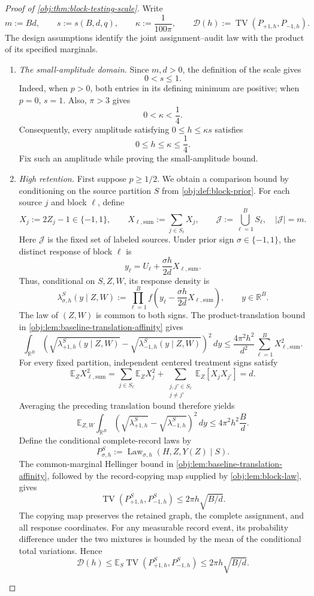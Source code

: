 \begin{proof}[Proof of \cref{obj:thm:block-testing-scale}]
Write
\[
m:=Bd,\qquad s:=s(B,d,q),\qquad
\kappa:=\frac1{100\pi},\qquad
\mathcal D(h):=\operatorname{TV}(P_{+1,h},P_{-1,h}).
\]
The design assumptions identify the joint assignment--audit law with the product of its specified marginals.

\begin{enumerate}
\item \textit{The small-amplitude domain.}
Since \(m,d>0\), the definition of the scale gives
\[
0<s\le1.
\]
Indeed, when \(p>0\), both entries in its defining minimum are positive; when \(p=0\), \(s=1\). Also, \(\pi>3\) gives
\[
0<\kappa<\frac14.
\]
Consequently, every amplitude satisfying \(0\le h\le\kappa s\) satisfies
\[
0\le h\le\kappa\le\frac14.
\]
Fix such an amplitude while proving the small-amplitude bound.

\item \textit{High retention.}
First suppose \(p\ge1/2\). We obtain a comparison bound by conditioning on the source partition \(S\) from \cref{obj:def:block-prior}. For each source \(j\) and block \(\ell\), define
\[
X_j:=2Z_j-1\in\{-1,1\},
\qquad
X_{\ell,\mathrm{sum}}:=\sum_{j\in S_\ell}X_j,
\qquad
\mathcal J:=\bigcup_{\ell=1}^{B}S_\ell,
\quad |\mathcal J|=m.
\]
Here \(\mathcal J\) is the fixed set of labeled sources. Under prior sign \(\sigma\in\{-1,1\}\), the distinct response of block \(\ell\) is
\[
y_\ell=U_\ell+\frac{\sigma h}{2d}X_{\ell,\mathrm{sum}}.
\]
Thus, conditional on \(S,Z,W\), its response density is
\[
\lambda^S_{\sigma,h}(y\mid Z,W)
:=
\prod_{\ell=1}^{B}
f\!\left(y_\ell-\frac{\sigma h}{2d}X_{\ell,\mathrm{sum}}\right),
\qquad y\in\mathbb R^B.
\]
The law of \((Z,W)\) is common to both signs. The product-translation bound in
\cref{obj:lem:baseline-translation-affinity} gives
\[
\int_{\mathbb R^B}
\left(
\sqrt{\lambda^S_{+1,h}(y\mid Z,W)}
-\sqrt{\lambda^S_{-1,h}(y\mid Z,W)}
\right)^2\,dy
\le
\frac{4\pi^2h^2}{d^2}
\sum_{\ell=1}^{B}X_{\ell,\mathrm{sum}}^2.
\]
For every fixed partition, independent centered treatment signs satisfy
\[
\mathbb E_Z X_{\ell,\mathrm{sum}}^2
=
\sum_{j\in S_\ell}\mathbb E_Z X_j^2
+
\sum_{\substack{j,j'\in S_\ell\\j\ne j'}}
\mathbb E_Z[X_jX_{j'}]
=d.
\]
Averaging the preceding translation bound therefore yields
\[
\mathbb E_{Z,W}\!
\int_{\mathbb R^B}
\left(
\sqrt{\lambda^S_{+1,h}}
-\sqrt{\lambda^S_{-1,h}}
\right)^2\,dy
\le 4\pi^2h^2\frac Bd.
\]
Define the conditional complete-record laws by
\[
P^S_{\sigma,h}:=\operatorname{Law}_{\sigma,h}(H,Z,Y(Z)\mid S).
\]
The common-marginal Hellinger bound in
\cref{obj:lem:baseline-translation-affinity}, followed by the record-copying map supplied by
\cref{obj:lem:block-law}, gives
\[
\operatorname{TV}(P^S_{+1,h},P^S_{-1,h})
\le 2\pi h\sqrt{B/d}.
\]
The copying map preserves the retained graph, the complete assignment, and all response coordinates. For any measurable record event, its probability difference under the two mixtures is bounded by the mean of the conditional total variations. Hence
\[
\mathcal D(h)
\le
\mathbb E_S\operatorname{TV}(P^S_{+1,h},P^S_{-1,h})
\le 2\pi h\sqrt{B/d}.
\]


\end{enumerate}
\end{proof}
